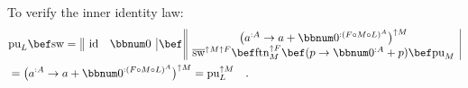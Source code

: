 To verify the inner identity law:
\begin{align*}
 & \text{pu}_{L}\bef\text{sw}=\,\begin{array}{||cc|}
\text{id} & \bbnum 0\end{array}\,\bef\,\begin{array}{||c|}
\big(a^{:A}\rightarrow a+\bbnum 0^{:(F\circ M\circ L)^{A}}\big)^{\uparrow M}\\
\overline{\text{sw}}^{\uparrow M\uparrow F}\bef\text{ftn}_{M}^{\uparrow F}\bef(p\rightarrow\bbnum 0^{:A}+p)\bef\text{pu}_{M}
\end{array}\\
 & =\big(a^{:A}\rightarrow a+\bbnum 0^{:(F\circ M\circ L)^{A}}\big)^{\uparrow M}=\text{pu}_{L}^{\uparrow M}\quad.
\end{align*}

